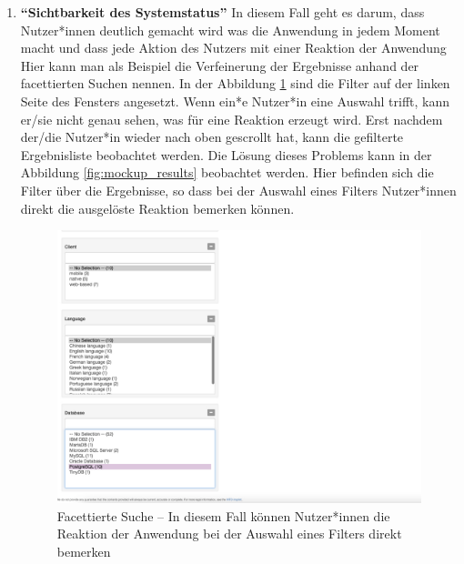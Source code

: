 \begin{enumerate}


\item \textbf{\enquote{Sichtbarkeit des Systemstatus}} \newline
In diesem Fall geht es darum, dass Nutzer*innen deutlich gemacht wird was die Anwendung in jedem Moment macht und dass jede Aktion des Nutzers mit einer Reaktion der Anwendung 
Hier kann man als Beispiel die Verfeinerung der Ergebnisse anhand der facettierten Suchen nennen.
In der Abbildung \ref{fig:point1_before} sind die Filter auf der linken Seite des Fensters angesetzt.
Wenn ein*e Nutzer*in eine Auswahl trifft, kann er/sie nicht genau sehen, was für eine Reaktion erzeugt wird.
Erst nachdem der/die Nutzer*in wieder nach oben gescrollt hat, kann die gefilterte Ergebnisliste beobachtet werden.
Die Lösung dieses Problems kann in der Abbildung \ref{fig:mockup_results} beobachtet werden.
Hier befinden sich die Filter über die Ergebnisse, so dass bei der Auswahl eines Filters Nutzer*innen direkt die ausgelöste Reaktion bemerken können.

\begin{figure}[H]
	\centering
    	\includegraphics[width=\textwidth]{Images/Punkt_1_davor}
   	\caption[Facettierte Suche]{Facettierte Suche -- In diesem Fall können Nutzer*innen die Reaktion der Anwendung bei der Auswahl eines Filters direkt bemerken}
   	\label{fig:point1_before}
\end{figure}



\end{enumerate}
